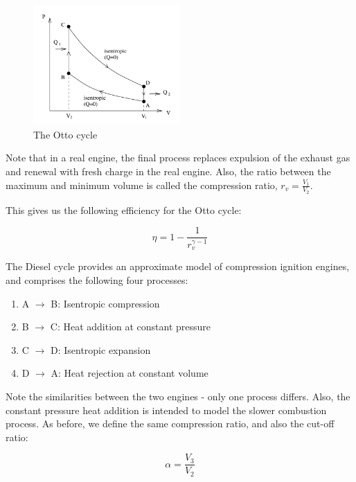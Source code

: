 \documentclass{article}
\begin{document}
\begin{figure}[h]
        \centering
        \includegraphics[width = 0.5\textwidth]{images/Screenshot 2024-04-03 171044.png}
        \caption{The Otto cycle}
        \label{fig:enter-label}
    \end{figure}

Note that in a real engine, the final process replaces expulsion of the exhaust gas and renewal with fresh charge in the real engine. Also, the ratio between the maximum and minimum volume is called the compression ratio, $r_v = \frac{V_1}{V_2}$.

This gives us the following efficiency for the Otto cycle:

\[ \eta = 1 - \frac{1}{r_v^{\gamma - 1}} \]

\begin{proposition}
    The Diesel cycle provides an approximate model of compression ignition engines, and comprises the following four processes:

    \begin{enumerate}
        \item A $\to$ B: Isentropic compression
        \item B $\to$ C: Heat addition at constant pressure
        \item C $\to$ D: Isentropic expansion
        \item D $\to$ A: Heat rejection at constant volume
    \end{enumerate}
    
\end{proposition}

Note the similarities between the two engines - only one process differs. Also, the constant pressure heat addition is intended to model the slower combustion process. As before, we define the same compression ratio, and also the cut-off ratio:

\[ \alpha = \frac{V_3}{V_2} \]
\end{document}
